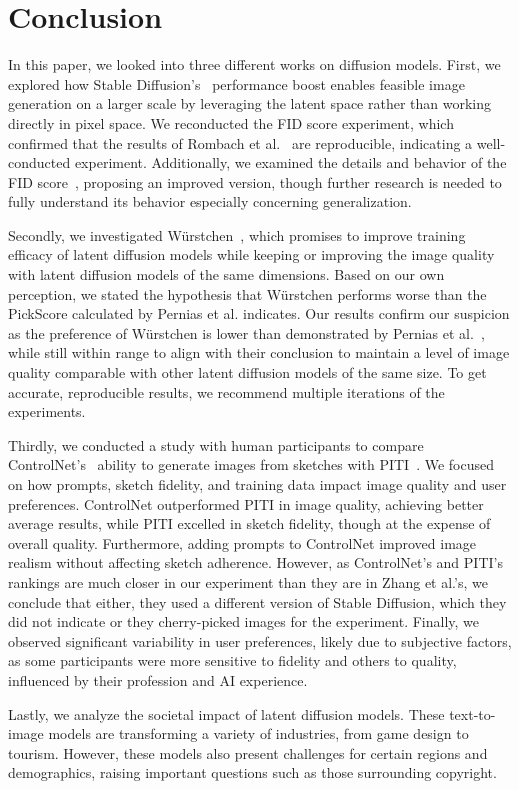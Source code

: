 \section{Conclusion}
In this paper, we looked into three different works on diffusion models. First,
we explored how Stable Diffusion's~\cite{rombach2022stablediffusion}
performance boost enables feasible image generation on a larger scale by
leveraging the latent space rather than working directly in pixel space. We
reconducted the FID score experiment, which confirmed that the results of
Rombach et al.~\cite{rombach2022stablediffusion} are reproducible, indicating a
well-conducted experiment. Additionally, we examined the details and behavior
of the FID score~\cite{heusel2018ganstrainedtimescaleupdate}, proposing an
improved version, though further research is needed to fully understand its
behavior especially concerning generalization.

Secondly, we investigated W\"urstchen~\cite{pernias2024wrstchen}, which promises
to improve training efficacy of latent diffusion models while keeping or
improving the image quality with latent diffusion models of the same dimensions.
Based on our own perception, we stated the hypothesis that W\"urstchen performs
worse than the PickScore calculated by Pernias et al. indicates.
Our results confirm our suspicion as the preference of W\"urstchen is lower
than demonstrated by Pernias et al.~\cite{pernias2024wrstchen}, while still within 
range to align with their conclusion to maintain a level of image quality comparable
with other latent diffusion models of the same size. To get accurate,
reproducible results, we recommend multiple iterations of the experiments.

Thirdly, we conducted a study with human participants to compare
ControlNet's~\cite{zhang2023addingconditionalcontroltexttoimage} ability to
generate images from sketches with
PITI~\cite{wang2022pretrainingneedimagetoimagetranslation}. We focused on how
prompts, sketch fidelity, and training data impact image quality and user
preferences. ControlNet outperformed PITI in image quality, achieving
better average results, while PITI excelled in sketch fidelity, though at the
expense of overall quality. Furthermore, adding prompts to ControlNet improved
image realism without affecting sketch adherence. However, as ControlNet's and 
PITI's rankings are much closer in our experiment than they are in Zhang et al.'s, 
we conclude that either, they used a different version of Stable Diffusion, 
which they did not indicate or they cherry-picked images for the experiment.
Finally, we observed significant variability in user preferences, likely due to
subjective factors, as some participants were more sensitive to fidelity and
others to quality, influenced by their profession and AI experience.

Lastly, we analyze the societal impact of latent diffusion models. These
text-to-image models are transforming a variety of industries, from game design
to tourism. However, these models also present challenges for certain regions
and demographics, raising important questions such as those surrounding
copyright.